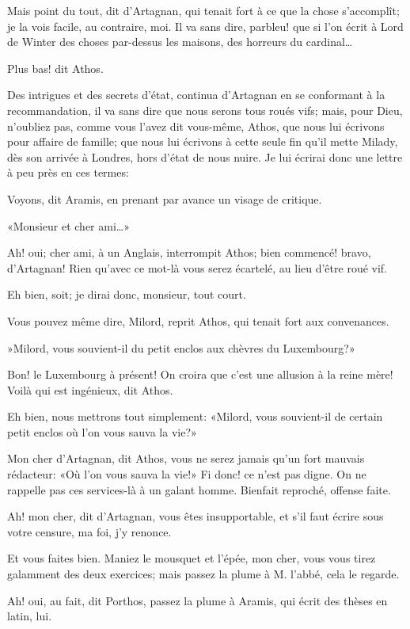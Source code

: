 \speak  Mais point du tout, dit d'Artagnan, qui tenait fort à ce que la chose s'accomplît; je la vois facile, au contraire, moi. Il va sans dire, parbleu! que si l'on écrit à Lord de Winter des choses par-dessus les maisons, des horreurs du cardinal\dots 

\speak  Plus bas! dit Athos. 

\speak  Des intrigues et des secrets d'état, continua d'Artagnan en se conformant à la recommandation, il va sans dire que nous serons tous roués vifs; mais, pour Dieu, n'oubliez pas, comme vous l'avez dit vous-même, Athos, que nous lui écrivons pour affaire de famille; que nous lui écrivons à cette seule fin qu'il mette Milady, dès son arrivée à Londres, hors d'état de nous nuire. Je lui écrirai donc une lettre à peu près en ces termes: 

\speak  Voyons, dit Aramis, en prenant par avance un visage de critique. 

\speak «Monsieur et cher ami\dots» 

\speak  Ah! oui; cher ami, à un Anglais, interrompit Athos; bien commencé! bravo, d'Artagnan! Rien qu'avec ce mot-là vous serez écartelé, au lieu d'être roué vif. 

\speak  Eh bien, soit; je dirai donc, monsieur, tout court. 

\speak  Vous pouvez même dire, Milord, reprit Athos, qui tenait fort aux convenances. 

\speak »Milord, vous souvient-il du petit enclos aux chèvres du Luxembourg?» 

\speak  Bon! le Luxembourg à présent! On croira que c'est une allusion à la reine mère! Voilà qui est ingénieux, dit Athos. 

\speak  Eh bien, nous mettrons tout simplement: «Milord, vous souvient-il de certain petit enclos où l'on vous sauva la vie?» 

\speak  Mon cher d'Artagnan, dit Athos, vous ne serez jamais qu'un fort mauvais rédacteur: «Où l'on vous sauva la vie!» Fi donc! ce n'est pas digne. On ne rappelle pas ces services-là à un galant homme. Bienfait reproché, offense faite. 

\speak  Ah! mon cher, dit d'Artagnan, vous êtes insupportable, et s'il faut écrire sous votre censure, ma foi, j'y renonce. 

\speak  Et vous faites bien. Maniez le mousquet et l'épée, mon cher, vous vous tirez galamment des deux exercices; mais passez la plume à M. l'abbé, cela le regarde. 

\speak  Ah! oui, au fait, dit Porthos, passez la plume à Aramis, qui écrit des thèses en latin, lui. 

